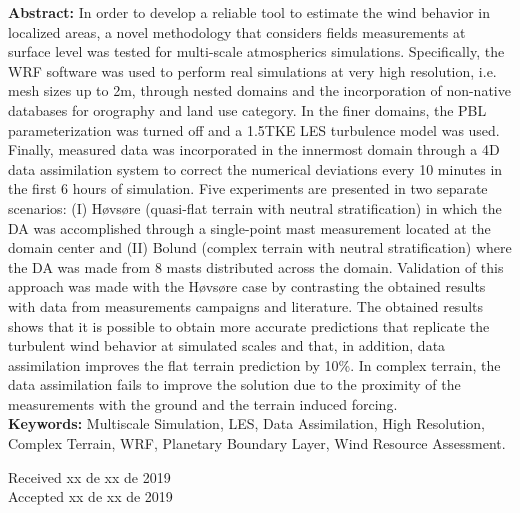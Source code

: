 \textbf{Abstract:}
In order to develop a reliable tool to estimate the wind behavior in localized areas, a novel methodology that considers fields measurements at surface level was tested for multi-scale atmospherics simulations.
%
Specifically, the WRF software was used to perform real simulations at very high resolution, i.e. mesh sizes up to 2m, through nested domains and the incorporation of non-native databases for orography and land use category. 
%
In the finer domains, the PBL parameterization was turned off and a 1.5TKE LES turbulence model was used. 
%
Finally, measured data was incorporated in the innermost domain through a 4D data assimilation system to correct the numerical deviations every 10 minutes in the first 6 hours of simulation. 
%
Five experiments are presented in two separate scenarios: (I) Høvsøre (quasi-flat terrain with neutral stratification) in which the DA was accomplished through a single-point mast measurement located at the domain center and (II) Bolund (complex terrain with neutral stratification) where the DA was made from 8 masts distributed across the domain.
%
Validation of this approach was made with the Høvsøre case by contrasting the obtained results with data from measurements campaigns and literature.
%
The obtained results shows that it is possible to obtain more accurate predictions
that replicate the turbulent wind behavior at simulated scales and that, in addition,
data assimilation improves the flat terrain prediction by 10\%. In complex terrain,
the data assimilation fails to improve the solution due to the proximity of the
measurements with the ground and the terrain induced forcing.\\
\textbf{Keywords:} Multiscale Simulation, LES, Data Assimilation, High Resolution, Complex Terrain, WRF, Planetary Boundary Layer, Wind Resource Assessment.

\bigskip
Received xx de xx de 2019\\
Accepted xx de xx de 2019 